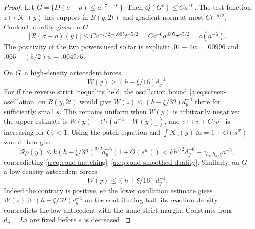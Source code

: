\begin{proof}
Let $G=\{D(\sigma-\rho)\le a^{-7+.01}\}$. Then
$Q(G^c)\le Ca^{.01}$. The test function
$z\mapsto\mathcal K_z(y)$ has support in $B(y,2t)$ and gradient
norm at most $Ct^{-5/2}$. Coulomb duality gives on $G$
\begin{equation}\label{a:eq:cond-smoothed-duality}
 |\mathcal R(\sigma-\rho)(y)|
  \le Ca^{-7/2+.005}t^{-5/2}
  =Ca^{-6}a^{.005}\tau^{-5/2}=o(a^{-6}).
\end{equation}
The positivity of the two powers used so far is explicit:
$.01-4w=.00996$ and $.005-(5/2)w=.004975$.

On $G$, a high-density antecedent forces
\begin{equation}\label{a:eq:cond-patch-high}
 W(y)\ge(h-\xi/16)d_y^{-4}.
\end{equation}
For if the reverse strict inequality held, the oscillation bound
\eqref{a:eq:screen-oscillation} on $B(y,2t)$ would give
$W(z)\le(h-\xi/32)d_y^{-4}$ there for sufficiently small $s$.
This remains uniform when $W(y)$ is arbitrarily negative:
the upper estimate is $W(y)+C\tau(a^{-4}+W(y)_-)$, and
$v\mapsto v+C\tau v_-$ is increasing for $C\tau<1$.
Using the patch equation and
$\int\mathcal K_z(y)\,\dd z=1+O(s^w)$ would then give
\[
 \mathcal R\rho(y)
   \le k(h-\xi/32)^{3/2}d_y^{-6}(1+O(s^w))
   <kh^{3/2}d_y^{-6}-c_{h_l,h_h,\xi}a^{-6},
\]
contradicting \eqref{a:eq:cond-matching}--\eqref{a:eq:cond-smoothed-duality}.
Similarly, on $G$ a low-density antecedent forces
\begin{equation}\label{a:eq:cond-patch-low}
 W(y)\le(h+\xi/16)d_y^{-4}.
\end{equation}
Indeed the contrary is positive, so the lower oscillation estimate
gives $W(z)\ge(h+\xi/32)d_y^{-4}$ on the contributing ball; its
reaction density contradicts the low antecedent with the same
strict margin. Constants from $d_y=La$ are fixed before $s$ is
decreased.


\end{proof}
